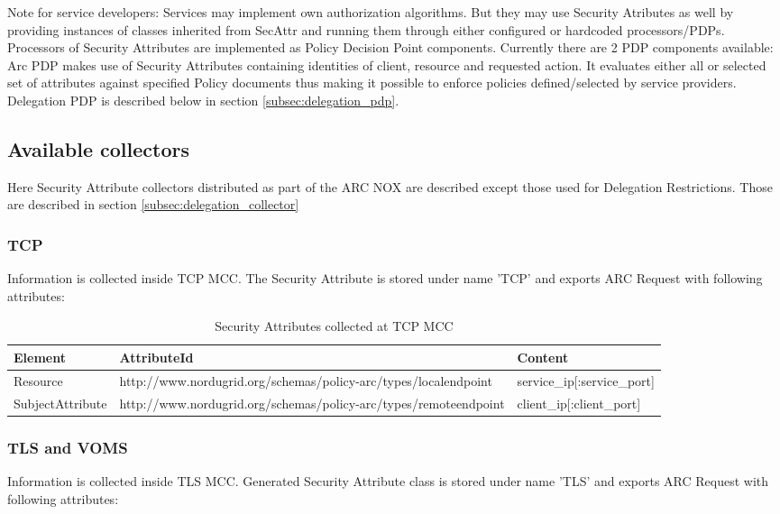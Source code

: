 \documentclass{article}                            %
\begin{document}
Note for service developers: Services may implement own authorization algorithms. But they may use Security Atributes as well by providing instances of classes inherited from SecAttr and running them through either configured or hardcoded processors/PDPs.
Processors of Security Attributes are implemented as Policy Decision Point components. Currently there are 2 PDP components available:
Arc PDP makes use of Security Attributes containing identities of client, resource and requested action. It evaluates either all or selected set of attributes against specified Policy documents thus making it possible to enforce policies defined/selected by service providers.
Delegation PDP is described below in section \ref{subsec:delegation_pdp}.


\subsection{Available collectors} %
\label{subsec:sec_attr_avail_collectors}

Here Security Attribute collectors distributed as part of the ARC NOX are described except those used for Delegation Restrictions. Those are described in section \ref{subsec:delegation_collector}

\subsubsection{TCP} %
\label{subsubsec:sec_attr_TCP}
Information is collected inside TCP MCC. The Security Attribute is stored under name 'TCP' and exports ARC Request with following attributes:

\begin{table}[ht]
\caption{Security Attributes collected at TCP MCC}
\centering
\begin{tabular}{| l | p{7cm} | p{5cm} |}
\hline
\textbf{Element} & \textbf{AttributeId} & \textbf{Content} \\ \hline
Resource & http://www.nordugrid.org/schemas/policy-arc/types/localendpoint & service\_ip[:service\_port] \\ \hline
SubjectAttribute & http://www.nordugrid.org/schemas/policy-arc/types/remoteendpoint & client\_ip[:client\_port] \\ \hline
\end{tabular}
\label{table:tcp_attr}
\end{table}


\subsubsection{TLS and VOMS} %
\label{subsubsec:sec_attr_TLS_VOMS}
Information is collected inside TLS MCC. Generated Security Attribute class is stored under name 'TLS' and exports ARC Request with following attributes:
\end{document}
